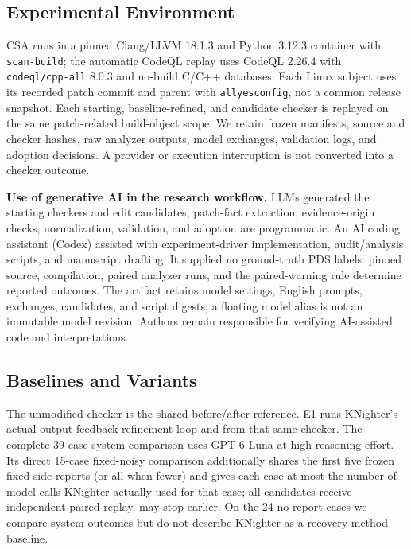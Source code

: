 \subsection{Experimental Environment}

CSA runs in a pinned Clang/LLVM 18.1.3 and Python 3.12.3 container with \texttt{scan-build}; the automatic CodeQL replay uses CodeQL 2.26.4 with \texttt{codeql/cpp-all} 8.0.3 and no-build C/C++ databases. Each Linux subject uses its recorded patch commit and parent with \texttt{allyesconfig}, not a common release snapshot. Each starting, baseline-refined, and candidate checker is replayed on the same patch-related build-object scope. We retain frozen manifests, source and checker hashes, raw analyzer outputs, model exchanges, validation logs, and adoption decisions. A provider or execution interruption is not converted into a checker outcome.

\textbf{Use of generative AI in the research workflow.}
LLMs generated the starting checkers and edit candidates; patch-fact extraction, evidence-origin checks, normalization, validation, and adoption are programmatic. An AI coding assistant (Codex) assisted with experiment-driver implementation, audit/analysis scripts, and manuscript drafting. It supplied no ground-truth PDS labels: pinned source, compilation, paired analyzer runs, and the paired-warning rule determine reported outcomes. The artifact retains model settings, English prompts, exchanges, candidates, and script digests; a floating model alias is not an immutable model revision. Authors remain responsible for verifying AI-assisted code and interpretations.

\subsection{Baselines and Variants}

The unmodified checker is the shared before/after reference. E1 runs KNighter's actual output-feedback refinement loop and \toolname from that same checker. The complete 39-case system comparison uses GPT-6-Luna at high reasoning effort. Its direct 15-case fixed-noisy comparison additionally shares the first five frozen fixed-side reports (or all when fewer) and gives each \toolname case at most the number of model calls KNighter actually used for that case; all candidates receive independent paired replay. \toolname may stop earlier. On the 24 no-report cases we compare system outcomes but do not describe KNighter as a recovery-method baseline.

